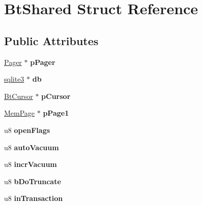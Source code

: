 \hypertarget{struct_bt_shared}{}\section{Bt\+Shared Struct Reference}
\label{struct_bt_shared}
\subsection*{Public Attributes}
\begin{DoxyCompactItemize}
\item 
\mbox{\label{struct_bt_shared_ab79703fc47a16446274457588d7eb989}} 
\mbox{\hyperlink{struct_pager}{Pager}} $\ast$ {\bfseries p\+Pager}
\item 
\mbox{\label{struct_bt_shared_a93dafa672793f6117a336d5987951c8e}} 
\mbox{\hyperlink{structsqlite3}{sqlite3}} $\ast$ {\bfseries db}
\item 
\mbox{\label{struct_bt_shared_a8f8b52dee390e5606e8e2a8511530de7}} 
\mbox{\hyperlink{struct_bt_cursor}{Bt\+Cursor}} $\ast$ {\bfseries p\+Cursor}
\item 
\mbox{\label{struct_bt_shared_a296dffd1c698ec175fee109718f32d5d}} 
\mbox{\hyperlink{struct_mem_page}{Mem\+Page}} $\ast$ {\bfseries p\+Page1}
\item 
\mbox{\label{struct_bt_shared_a8fbc250e23d7c417ccfec8cceb08329d}} 
u8 {\bfseries open\+Flags}
\item 
\mbox{\label{struct_bt_shared_a770c4f6244d4350f27029cb909902a61}} 
u8 {\bfseries auto\+Vacuum}
\item 
\mbox{\label{struct_bt_shared_a8d8ba06335a63d8a36294a0f1ae8377a}} 
u8 {\bfseries incr\+Vacuum}
\item 
\mbox{\label{struct_bt_shared_a57de6e40475fc532a5de79760521e957}} 
u8 {\bfseries b\+Do\+Truncate}
\item 
\mbox{\label{struct_bt_shared_aeaa6c0f33b83434ecee4bd8c4c8df48e}} 
u8 {\bfseries in\+Transaction}
\item 

\end{DoxyCompactItemize}
